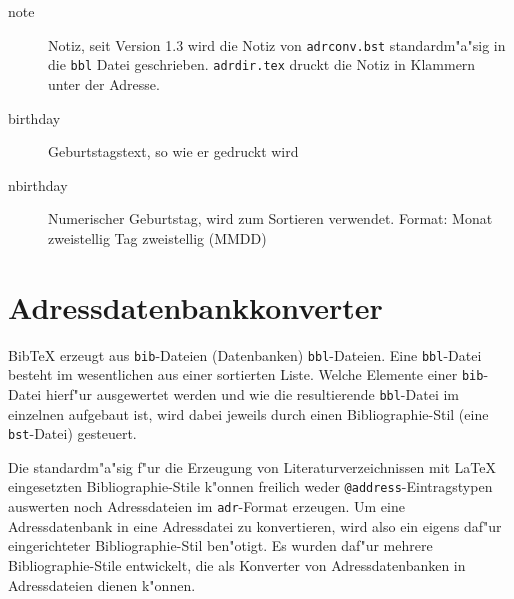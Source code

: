 \documentclass{article}
\newcommand*{\File}[1]{\texttt{#1}}
\begin{document}
\begin{description}
	\item[note]  Notiz, seit Version 1.3 wird die Notiz von
      \File{adrconv.bst} standardm"a"sig in die \texttt{bbl} Datei geschrieben. 
      \File{adrdir.tex} druckt die Notiz in Klammern unter der Adresse.
	
	\item[birthday] Geburtstagstext, so wie er gedruckt wird
	
	\item[nbirthday] Numerischer Geburtstag, wird zum Sortieren 
	verwendet. Format: Monat zweistellig Tag zweistellig (MMDD)
\end{description}

\section{Adressdatenbankkonverter}%

Bib\TeX{} erzeugt aus \File{bib}-Dateien (Datenbanken) \File{bbl}-Dateien.
Eine \File{bbl}-Datei besteht im wesentlichen aus einer sortierten Liste.
Welche Elemente einer \File{bib}-Datei hierf"ur ausgewertet werden und wie
die resultierende \File{bbl}-Datei im einzelnen aufgebaut ist, wird dabei
jeweils durch einen Bibliographie-Stil (eine \File{bst}-Datei) gesteuert. 

Die standardm"a"sig f"ur die Erzeugung von Literaturverzeichnissen mit
\LaTeX{} eingesetzten Bibliographie-Stile k"onnen freilich weder
\verb|@address|-Eintragstypen auswerten noch Adressdateien im
\File{adr}-Format erzeugen.  Um eine Adressdatenbank in eine Adressdatei zu
konvertieren, wird also ein eigens daf"ur eingerichteter Bibliographie-Stil
ben"otigt.  Es wurden daf"ur mehrere Bibliographie-Stile entwickelt, die als
Konverter von Adressdatenbanken in Adressdateien dienen k"onnen.
\end{document}
